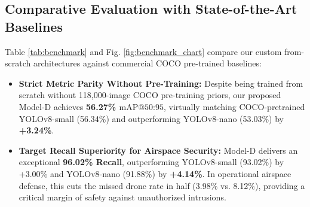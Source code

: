 \documentclass[conference]{IEEEtran}
\begin{document}
\subsection{Comparative Evaluation with State-of-the-Art Baselines}
Table \ref{tab:benchmark} and Fig. \ref{fig:benchmark_chart} compare our custom from-scratch architectures against commercial COCO pre-trained baselines:
\begin{itemize}
    \item \textbf{Strict Metric Parity Without Pre-Training:} Despite being trained from scratch without 118,000-image COCO pre-training priors, our proposed Model-D achieves \textbf{56.27\% $\text{mAP@50:95}$}, virtually matching COCO-pretrained YOLOv8-small (56.34\%) and outperforming YOLOv8-nano (53.03\%) by \textbf{+3.24\%}.
    \item \textbf{Target Recall Superiority for Airspace Security:} Model-D delivers an exceptional \textbf{96.02\% Recall}, outperforming YOLOv8-small (93.02\%) by +3.00\% and YOLOv8-nano (91.88\%) by \textbf{+4.14\%}. In operational airspace defense, this cuts the missed drone rate in half (3.98\% vs. 8.12\%), providing a critical margin of safety against unauthorized intrusions.
\end{itemize}

\begin{table}[t]
\centering
\caption{Master Benchmark Comparison Against State-of-the-Art Pre-Trained Baselines}
\label{tab:benchmark}
\end{table}
\end{document}
